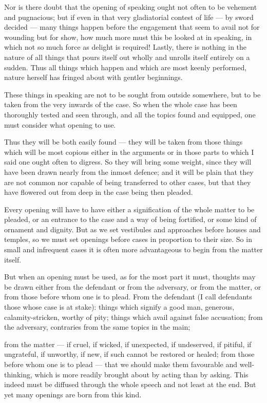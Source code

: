  Nor is there doubt that the opening of speaking ought not often to be vehement and pugnacious; but if even in that very gladiatorial contest of life — by sword decided — many things happen before the engagement that seem to avail not for wounding but for show, how much more must this be looked at in speaking, in which not so much force as delight is required! Lastly, there is nothing in the nature of all things that pours itself out wholly and unrolls itself entirely on a sudden. Thus all things which happen and which are most keenly performed, nature herself has fringed about with gentler beginnings.

 These things in speaking are not to be sought from outside somewhere, but to be taken from the very inwards of the case. So when the whole case has been thoroughly tested and seen through, and all the topics found and equipped, one must consider what opening to use.

 Thus they will be both easily found — they will be taken from those things which will be most copious either in the arguments or in those parts to which I said one ought often to digress. So they will bring some weight, since they will have been drawn nearly from the inmost defence; and it will be plain that they are not common nor capable of being transferred to other cases, but that they have flowered out from deep in the case being then pleaded.

 Every opening will have to have either a signification of the whole matter to be pleaded, or an entrance to the case and a way of being fortified, or some kind of ornament and dignity. But as we set vestibules and approaches before houses and temples, so we must set openings before cases in proportion to their size. So in small and infrequent cases it is often more advantageous to begin from the matter itself.

 But when an opening must be used, as for the most part it must, thoughts may be drawn either from the defendant or from the adversary, or from the matter, or from those before whom one is to plead. From the defendant (I call defendants those whose case is at stake): things which signify a good man, generous, calamity-stricken, worthy of pity; things which avail against false accusation; from the adversary, contraries from the same topics in the main;

 from the matter — if cruel, if wicked, if unexpected, if undeserved, if pitiful, if ungrateful, if unworthy, if new, if such cannot be restored or healed; from those before whom one is to plead — that we should make them favourable and well-thinking, which is more readily brought about by acting than by asking. This indeed must be diffused through the whole speech and not least at the end. But yet many openings are born from this kind.

